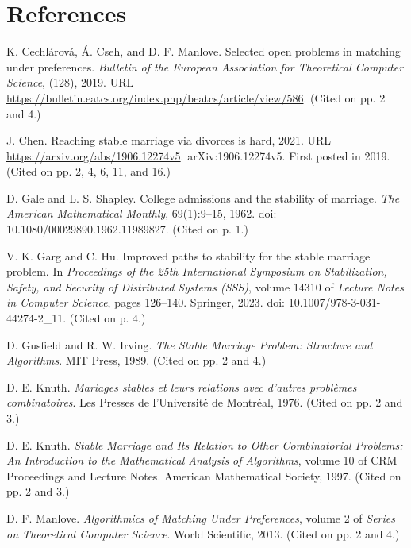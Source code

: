 \documentclass[11pt,letterpaper]{article}
\theoremstyle{definition}
\begin{document}
\section*{References}
\begin{list}{}{\setlength{\leftmargin}{1em}\setlength{\itemindent}{-1em}\setlength{\itemsep}{.75em}\setlength{\parsep}{0pt}}
\item K. Cechlárová, Á. Cseh, and D. F. Manlove. Selected open problems in matching under preferences. \emph{Bulletin of the European Association for Theoretical Computer Science}, (128), 2019. URL \url{https://bulletin.eatcs.org/index.php/beatcs/article/view/586}. (Cited on pp. 2 and 4.)

\item J. Chen. Reaching stable marriage via divorces is hard, 2021. URL \url{https://arxiv.org/abs/1906.12274v5}. arXiv:1906.12274v5. First posted in 2019. (Cited on pp. 2, 4, 6, 11, and 16.)

\item D. Gale and L. S. Shapley. College admissions and the stability of marriage. \emph{The American Mathematical Monthly}, 69(1):9--15, 1962. doi: 10.1080/00029890.1962.11989827. (Cited on p. 1.)

\item V. K. Garg and C. Hu. Improved paths to stability for the stable marriage problem. In \emph{Proceedings of the 25th International Symposium on Stabilization, Safety, and Security of Distributed Systems (SSS)}, volume 14310 of \emph{Lecture Notes in Computer Science}, pages 126--140. Springer, 2023. doi: 10.1007/978-3-031-44274-2\_11. (Cited on p. 4.)

\item D. Gusfield and R. W. Irving. \emph{The Stable Marriage Problem: Structure and Algorithms}. MIT Press, 1989. (Cited on pp. 2 and 4.)

\item D. E. Knuth. \emph{Mariages stables et leurs relations avec d'autres problèmes combinatoires}. Les Presses de l'Université de Montréal, 1976. (Cited on pp. 2 and 3.)

\item D. E. Knuth. \emph{Stable Marriage and Its Relation to Other Combinatorial Problems: An Introduction to the Mathematical Analysis of Algorithms}, volume 10 of CRM Proceedings and Lecture Notes. American Mathematical Society, 1997. (Cited on pp. 2 and 3.)

\item D. F. Manlove. \emph{Algorithmics of Matching Under Preferences}, volume 2 of \emph{Series on Theoretical Computer Science}. World Scientific, 2013. (Cited on pp. 2 and 4.)


\end{list}
\end{document}
